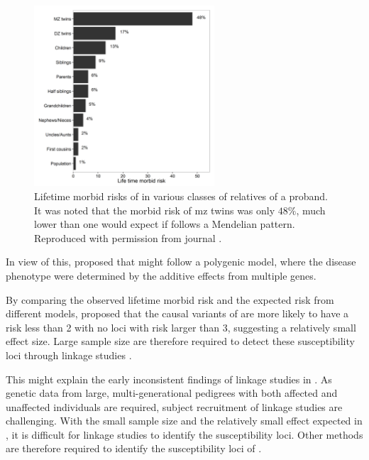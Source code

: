 	\begin{figure}[t]
		\centering
		\includegraphics[width=0.6\textwidth]{figure/lifeTimeMorbidRisk.png}
		\caption[Lifetime morbid risks of  in various classes of relatives of a proband]{Lifetime morbid risks of  in various classes of relatives of a proband.
			It was noted that the morbid risk of \gls{mz} twins was only $48\%$, much lower than one would expect if  follows a Mendelian pattern.
			Reproduced with permission from journal \citep{Riley2006}. \label{fig:lifeMRscz}}
	\end{figure}
	
	In view of this, \citet{Gottesman1967} proposed that  might follow a polygenic model, where the disease phenotype were determined by the additive effects from multiple genes.
	
	By comparing the observed lifetime morbid risk and the expected risk from different models, \citet{Risch1990} proposed that the causal variants of  are more likely to have a risk less than 2 with no loci with risk larger than 3, suggesting a relatively small effect size.
	Large sample size are therefore required to detect these susceptibility loci through linkage studies \citep{Risch1990}.
	
	This might explain the early inconsistent findings of linkage studies in  \citep{Harrison2005}.
	As genetic data from large, multi-generational pedigrees with both affected and unaffected individuals are required, subject recruitment of linkage studies are challenging. 
	With the small sample size and the relatively small effect expected in , it is difficult for linkage studies to identify the susceptibility loci. 
	Other methods are therefore required to identify the susceptibility loci of .
	

